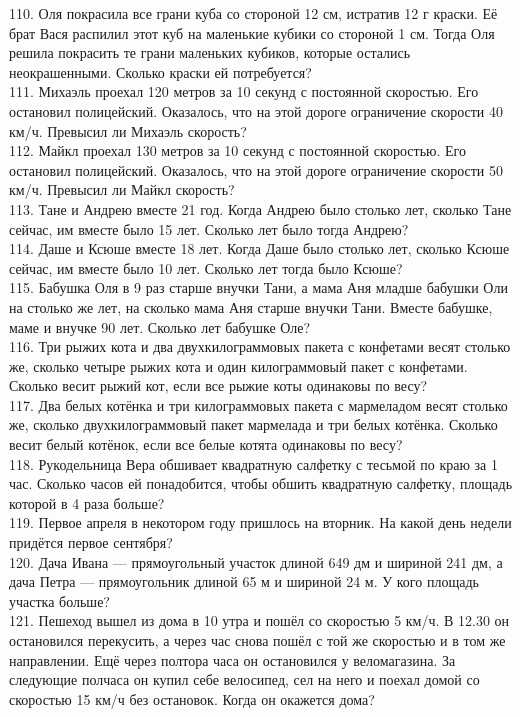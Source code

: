 110. Оля покрасила все грани куба со стороной 12 см, истратив 12 г краски. Её брат Вася распилил этот куб на маленькие кубики со стороной 1 см. Тогда Оля решила покрасить те грани маленьких кубиков, которые остались неокрашенными. Сколько краски ей потребуется?\\
111. Михаэль проехал 120 метров за 10 секунд с постоянной скоростью. Его остановил полицейский. Оказалось, что на этой дороге ограничение скорости 40 км/ч. Превысил ли Михаэль скорость?\\
112. Майкл проехал 130 метров за 10 секунд с постоянной скоростью. Его остановил полицейский. Оказалось, что на этой дороге ограничение скорости 50 км/ч. Превысил ли Майкл скорость?\\
113. Тане и Андрею вместе 21 год. Когда Андрею было столько лет, сколько Тане сейчас, им вместе было 15 лет. Сколько лет было тогда Андрею?\\
114. Даше и Ксюше вместе 18 лет. Когда Даше было столько лет, сколько Ксюше сейчас, им вместе было 10 лет. Сколько лет тогда было Ксюше?\\
115. Бабушка Оля в 9 раз старше внучки Тани, а мама Аня младше бабушки Оли на столько же лет, на сколько мама Аня старше внучки Тани. Вместе бабушке, маме и внучке 90 лет. Сколько лет бабушке Оле?\\
116. Три рыжих кота и два двухкилограммовых пакета с конфетами весят столько же, сколько четыре рыжих кота и один килограммовый пакет с конфетами. Сколько весит рыжий кот, если все рыжие коты одинаковы по весу?\\
117. Два белых котёнка и три килограммовых пакета с мармеладом весят столько же, сколько двухкилограммовый пакет мармелада и три белых котёнка. Сколько весит белый котёнок, если все белые котята одинаковы по весу?\\
118. Рукодельница Вера обшивает квадратную салфетку с тесьмой по краю за 1 час. Сколько часов ей понадобится, чтобы обшить квадратную салфетку, площадь которой в 4 раза больше?\\
119. Первое апреля в некотором году пришлось на вторник. На какой день недели придётся первое сентября?\\
120. Дача Ивана --- прямоугольный участок длиной 649 дм и шириной 241 дм, а дача Петра --- прямоугольник длиной 65 м и шириной 24 м. У кого площадь участка больше?\\
121. Пешеход вышел из дома в 10 утра и пошёл со скоростью 5 км/ч. В 12.30 он остановился перекусить, а через час снова пошёл с той же скоростью и в том же направлении. Ещё через полтора часа он остановился у веломагазина. За следующие полчаса он купил себе велосипед, сел на него и поехал домой со скоростью 15 км/ч без остановок. Когда он окажется дома?\\
